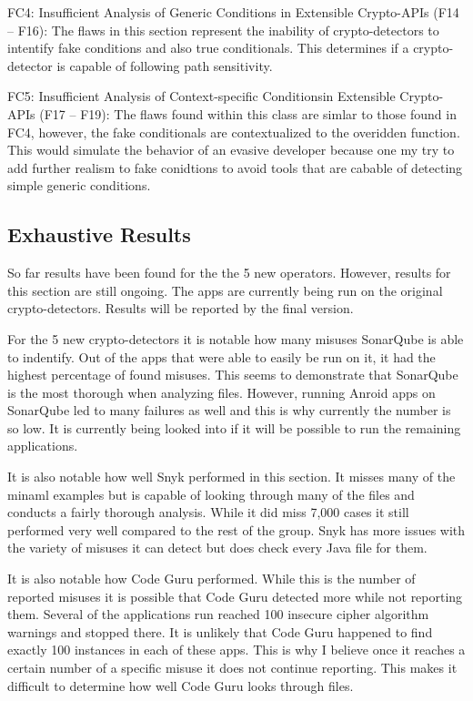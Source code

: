 FC4: Insufficient Analysis of Generic Conditions in Extensible Crypto-APIs (F14 – F16): The flaws in this section represent the inability of crypto-detectors to intentify fake conditions and also true conditionals. This determines if a crypto-detector is capable of following path sensitivity.

FC5: Insufficient Analysis of Context-specific Conditionsin Extensible Crypto-APIs (F17 – F19): The flaws found within this class are simlar to those found in FC4, however, the fake conditionals are contextualized to the overidden function. This would simulate the behavior of an evasive developer because one my try to add further realism to fake conidtions to avoid tools that are cabable of detecting simple generic conditions.


\subsection{Exhaustive Results}
\label{ch5:sec:discussion}



So far results have been found for the the 5 new operators. However, results for this section are still ongoing. The apps are currently being run on the original crypto-detectors. Results will be reported by the final version.

For the 5 new crypto-detectors it is notable how many misuses SonarQube is able to indentify. Out of the apps that were able to easily be run on it, it had the highest percentage of found misuses. This seems to demonstrate that SonarQube is the most thorough when analyzing files. However, running Anroid apps on SonarQube led to many failures as well and this is why currently the number is so low. It is currently being looked into if it will be possible to run the remaining applications. 

It is also notable how well Snyk performed in this section. It misses many of the minaml examples but is capable of looking through many of the files and conducts a fairly thorough analysis. While it did miss 7,000 cases it still performed very well compared to the rest of the group. Snyk has more issues with the variety of misuses it can detect but does check every Java file for them.

It is also notable how Code Guru performed. While this is the number of reported misuses it is possible that Code Guru detected more while not reporting them. Several of the applications run reached 100 insecure cipher algorithm warnings and stopped there. It is unlikely that Code Guru happened to find exactly 100 instances in each of these apps. This is why I believe once it reaches a certain number of a specific misuse it does not continue reporting. This makes it difficult to determine how well Code Guru looks through files.
